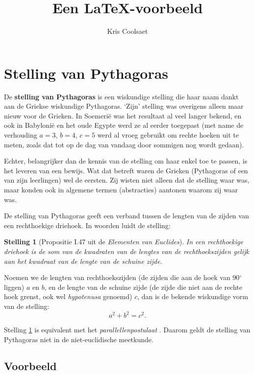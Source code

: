 \documentclass[11pt,a4paper]{amsart}
\title{Een \LaTeX-voorbeeld}
\author{Kris Coolsaet}
\newtheorem{stelling}{Stelling}
\begin{document}
\maketitle
\section{Stelling van Pythagoras}

De \textbf{stelling van Pythagoras} is een wiskundige stelling die haar naam 
dankt aan de Griekse wiskundige Pythagoras. `Zijn' stelling was overigens 
alleen maar nieuw voor de Grieken. In Soemerië was het resultaat al veel langer 
bekend, en ook in Babylonië en het oude Egypte werd ze al eerder toegepast (met 
name de verhouding \(a=3\), \(b=4\), \(c=5\) werd al vroeg gebruikt om rechte hoeken uit te 
meten, zoals dat tot op de dag van vandaag door sommigen nog wordt gedaan). 

Echter, belangrijker dan de kennis van de stelling om haar enkel toe te passen, 
is het leveren van een bewijs. Wat dat betreft waren de Grieken (Pythagoras of 
een van zijn leerlingen) wel de eersten. Zij wisten niet alleen dat de stelling 
waar was, maar konden ook in algemene termen (abstracties) aantonen waarom zij 
waar was.

De stelling van Pythagoras geeft een verband tussen de lengten van de zijden 
van een rechthoekige driehoek. In woorden luidt de stelling:

\begin{stelling}[Propositie I.47 uit de \emph{Elementen van Euclides}]
\label{st-pythagoras}
In een rechthoekige driehoek is de som van de kwadraten van de lengtes van de 
rechthoekszijden gelijk aan het kwadraat van de lengte van de schuine zijde.
\end{stelling}

Noemen we de lengten van rechthoekszijden (de zijden die aan de hoek van 
90\({}^\circ\) 
liggen) \(a\) en \(b\), en de lengte van de schuine zijde (de zijde die niet 
aan de rechte hoek grenst, ook wel \emph{hypotenusa} genoemd) \(c\), dan is de 
bekende wiskundige vorm van de stelling:
\begin{equation}
\label{eq-pythagoras}
a^2 + b^2 = c^2.
\end{equation}

Stelling \ref{st-pythagoras} is equivalent met het \emph{parallellenpostulaat} 
\cite{Brodie}. 
Daarom 
geldt de stelling van Pythagoras niet in de niet-euclidische meetkunde.


\subsection{Voorbeeld}
\end{document}
